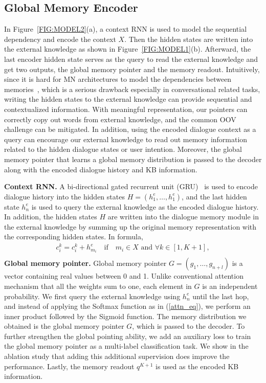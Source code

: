 \documentclass{article} \usepackage{iclr2019_conference,times}
\begin{document}
\subsection{Global Memory Encoder}
In Figure~\ref{FIG:MODEL2}(a), a context RNN is used to model the sequential dependency and encode the context $X$. Then the hidden states are written into the external knowledge as shown in Figure~\ref{FIG:MODEL1}(b). Afterward, the last encoder hidden state serves as the query to read the external knowledge and get two outputs, the global memory pointer and the memory readout. Intuitively, since it is hard for MN architectures to model the dependencies between memories~\citep{dqmem8461426}, which is a serious drawback especially in conversational related tasks, writing the hidden states to the external knowledge can provide sequential and contextualized information. With meaningful representation, our pointers can correctly copy out words from external knowledge, and the common OOV challenge can be mitigated. In addition, using the encoded dialogue context as a query can encourage our external knowledge to read out memory information related to the hidden dialogue states or user intention. Moreover, the global memory pointer that learns a global memory distribution is passed to the decoder along with the encoded dialogue history and KB information.

\textbf{Context RNN.}
A bi-directional gated recurrent unit (GRU)~\citep{GRU} is used to encode dialogue history into the hidden states $H = (h_1^e,\dots,h_1^e)$, and the last hidden state $h_n^e$ is used to query the external knowledge as the encoded dialogue history. In addition, the hidden states $H$ are written into the dialogue memory module in the external knowledge by summing up the original memory representation with the corresponding hidden states. In formula,
\begin{equation}
    \begin{array}{c}
        c^k_i = c^k_i + h^e_{m_i}  \quad \textrm{if} \quad m_i \in X \text{ and } \forall k \in [1,K+1], \\
    \end{array}
\end{equation}
\textbf{Global memory pointer.}
Global memory pointer $G = (g_1,\dots,g_{n+l})$ is a vector containing real values between 0 and 1. Unlike conventional attention mechanism that all the weights sum to one, each element in $G$ is an independent probability. We first query the external knowledge using $h^e_n$ until the last hop, and instead of applying the Softmax function as in (\ref{attn_eq}), we perform an inner product followed by the Sigmoid function. The memory distribution we obtained is the global memory pointer $G$, which is passed to the decoder. To further strengthen the global pointing ability, we add an auxiliary loss to train the global memory pointer as a multi-label classification task. We show in the ablation study that adding this additional supervision does improve the performance. Lastly, the memory readout $q^{K+1}$ is used as the encoded KB information.
\end{document}
